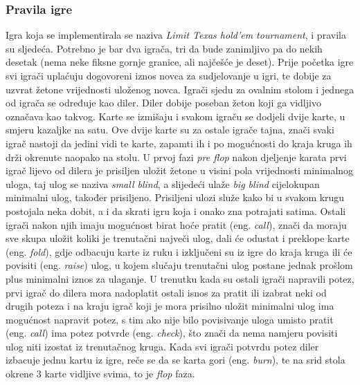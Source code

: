 \subsubsection{Pravila igre}
Igra koja se implementirala se naziva \emph{Limit Texas hold'em tournament}, i pravila su sljedeća. 
Potrebno je bar dva igrača, tri da bude zanimljivo pa do nekih desetak (nema neke fiksne gornje granice, 
ali najčešće je deset). Prije početka igre svi igrači uplaćuju dogovoreni iznos novca za sudjelovanje u igri, te dobije za uzvrat žetone vrijednosti uloženog novca. Igrači sjedu za ovalnim stolom i jednega od igrača se određuje kao diler. Diler dobije poseban žeton koji ga vidljivo označava kao takvog. Karte se izmišaju i svakom igraču se dodjeli dvije karte, u smjeru kazaljke na satu. Ove dvije karte su za ostale igrače tajna, znači svaki igrač nastoji da jedini vidi te karte, zapamti ih i po mogućnosti do kraja kruga ih drži okrenute naopako na stolu. U prvoj fazi \emph{pre flop} nakon djeljenje karata prvi igrač lijevo od dilera je prisiljen uložit žetone u visini pola vrijednosti minimalnog uloga, taj ulog se naziva \emph{small blind}, a slijedeći ulaže \emph{big blind} cijelokupan minimalni ulog, također prisiljeno. Prisiljeni ulozi služe kako bi u svakom krugu postojala neka dobit, a i da skrati igru koja i onako zna potrajati satima. Ostali igrači nakon njih imaju mogućnost birat hoće pratit (eng. \textit{call}), znači da moraju sve skupa uložit koliki je trenutačni največi ulog, dali će odustat i preklope karte (eng. \textit{fold}), gdje odbacuju karte iz ruku i izključeni su iz igre do kraja kruga ili će povisiti (eng. \textit{raise}) ulog, u kojem slučaju trenutačni ulog postane jednak prošlom plus minimalni iznos za ulaganje. U trenutku kada su ostali igrači napravili potez, prvi igrač do dilera mora nadoplatit ostali isnos za pratit ili izabrat neki od drugih poteza i na kraju igrač koji je mora prisilno uložit minimalni ulog ima mogućnost napravit potez, s tim ako nije bilo povisivanje uloga umisto pratit (eng. \textit{call}) ima potez potvrde (eng. \textit{check}), što znači da nema namjeru povisiti ulog niti izostat iz trenutačnog kruga. Kada svi igrači potvrdu potez diler izbacuje jednu kartu iz igre, reče se da se karta gori (eng. \textit{burn}), te na srid stola okrene 3 karte vidljive svima, to je \emph{flop} faza. 
